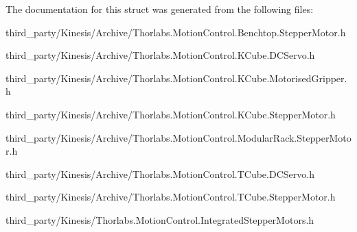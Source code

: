 The documentation for this struct was generated from the following files\+:\begin{DoxyCompactItemize}
\item 
third\+\_\+party/\+Kinesis/\+Archive/Thorlabs.\+Motion\+Control.\+Benchtop.\+Stepper\+Motor.\+h\item 
third\+\_\+party/\+Kinesis/\+Archive/Thorlabs.\+Motion\+Control.\+K\+Cube.\+D\+C\+Servo.\+h\item 
third\+\_\+party/\+Kinesis/\+Archive/Thorlabs.\+Motion\+Control.\+K\+Cube.\+Motorised\+Gripper.\+h\item 
third\+\_\+party/\+Kinesis/\+Archive/Thorlabs.\+Motion\+Control.\+K\+Cube.\+Stepper\+Motor.\+h\item 
third\+\_\+party/\+Kinesis/\+Archive/Thorlabs.\+Motion\+Control.\+Modular\+Rack.\+Stepper\+Motor.\+h\item 
third\+\_\+party/\+Kinesis/\+Archive/Thorlabs.\+Motion\+Control.\+T\+Cube.\+D\+C\+Servo.\+h\item 
third\+\_\+party/\+Kinesis/\+Archive/Thorlabs.\+Motion\+Control.\+T\+Cube.\+Stepper\+Motor.\+h\item 
third\+\_\+party/\+Kinesis/Thorlabs.\+Motion\+Control.\+Integrated\+Stepper\+Motors.\+h\end{DoxyCompactItemize}
